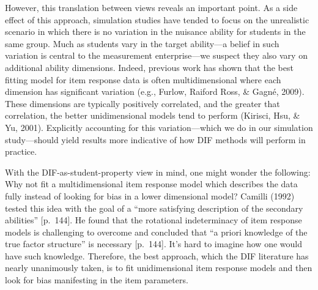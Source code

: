 \documentclass[
  english,
  man,floatsintext]{apa6}
\begin{document}
However, this translation between views reveals an important point. As a side effect of this approach, simulation studies have tended to focus on the unrealistic scenario in which there is no variation in the nuisance ability for students in the same group. Much as students vary in the target ability---a belief in such variation is central to the measurement enterprise---we suspect they also vary on additional ability dimensions. Indeed, previous work has shown that the best fitting model for item response data is often multidimensional where each dimension has significant variation (e.g., Furlow, Raiford Ross, \& Gagné, 2009). These dimensions are typically positively correlated, and the greater that correlation, the better unidimensional models tend to perform (Kirisci, Hsu, \& Yu, 2001). Explicitly accounting for this variation---which we do in our simulation study---should yield results more indicative of how DIF methods will perform in practice.

With the DIF-as-student-property view in mind, one might wonder the following: Why not fit a multidimensional item response model which describes the data fully instead of looking for bias in a lower dimensional model? Camilli (1992) tested this idea with the goal of a ``more satisfying description of the secondary abilities'' {[}p.~144{]}. He found that the rotational indeterminacy of item response models is challenging to overcome and concluded that ``a priori knowledge of the true factor structure'' is necessary {[}p.~144{]}. It's hard to imagine how one would have such knowledge. Therefore, the best approach, which the DIF literature has nearly unanimously taken, is to fit unidimensional item response models and then look for bias manifesting in the item parameters.
\end{document}
